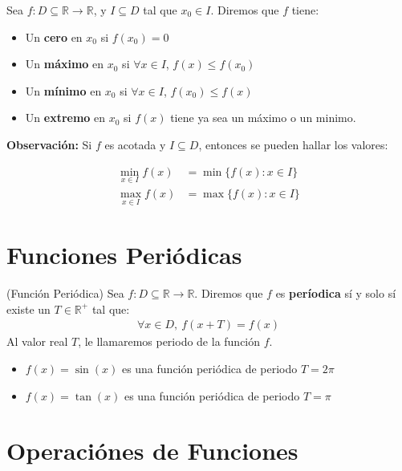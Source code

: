 \documentclass[12pt]{book}
\begin{document}
\begin{defi}{}{}
    Sea $f : D \subseteq \mathbb{R} \to \mathbb{R}$, y $I \subseteq D$ tal que $x_0 \in I$. Diremos que $f$ tiene:
    \begin{itemize}
        \item Un \textbf{cero} en $x_0$ si $f(x_0)=0$

        \item Un \textbf{máximo} en $x_0$ si $\forall x \in I$, $f(x)\leq f(x_0)$

        \item Un \textbf{mínimo} en $x_0$ si $\forall x \in I$, $f(x_0)\leq f(x)$

        \item Un \textbf{extremo} en $x_0$ si $f(x)$ tiene ya sea un máximo o un minimo. 
    \end{itemize}
\end{defi}

\textbf{Observación:} Si $f$ es acotada y $I \subseteq D$, entonces se pueden hallar los valores:

\begin{align*}
    \min_{x \in I}f(x)&=\min\{f(x) : x \in I \} \\
    \max_{x \in I}f(x)&= \max\{f(x) : x \in I\}
\end{align*}

\section{Funciones Periódicas}
\begin{defi}{(Función Periódica)}{}
    Sea $f : D \subseteq \mathbb{R} \to \mathbb{R}$. Diremos que $f$ es \textbf{períodica} sí y solo sí existe un $T \in \mathbb{R}^+$ tal que:
\begin{align*}
    \forall x \in D, \ f(x+T) = f(x)
\end{align*}
Al valor real $T$, le llamaremos periodo de la función $f$.
\end{defi}
\begin{eje}{}{}
    \begin{itemize}
        \item $f(x)=\sin(x)$ es una función periódica de periodo $T=2\pi$

        \item $f(x)=\tan(x)$ es una función periódica de periodo $T=\pi$
    \end{itemize}
\end{eje}
\section{Operaciónes de Funciones}
\end{document}
